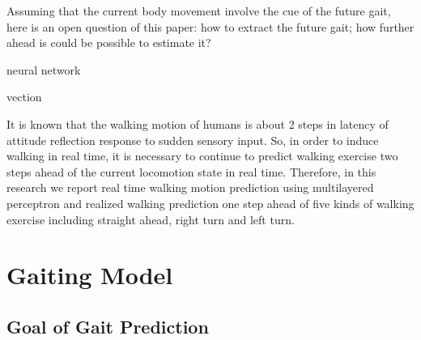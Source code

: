 \documentclass{sigchi}
\begin{document}
Assuming that the current body movement involve the cue of the future gait, here is an open question of this paper: how to extract the future gait; how further ahead is could be possible to estimate it?

neural network\cite{LIU1999391}

vection\cite{JPR:JPR167,pmid7845766,pmid25774143,Furukawa:2011:VFP:1959826.1959845}



It is known that the walking motion of humans is about 2 steps in latency of attitude reflection response to sudden sensory input\cite{bib01}.
So, in order to induce walking in real time, it is necessary to continue to predict walking exercise two steps ahead of the current locomotion state in real time.
Therefore, in this research we report real time walking motion prediction using multilayered perceptron and realized walking prediction one step ahead of five kinds of walking exercise including straight ahead, right turn and left turn.

\section{Gaiting Model}

\subsection{Goal of Gait Prediction} %
\end{document}
